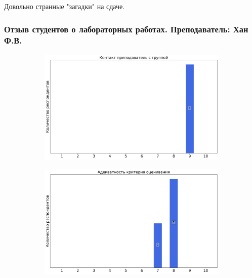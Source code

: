                 \begin{commentbox} 
                    Довольно странные "загадки" на сдаче. 
                \end{commentbox}

                
        \subsubsection{Отзыв студентов о лабораторных работах. Преподаватель: Хан Ф.В.}
            \begin{figure}[H]
                \centering
                \begin{subfigure}[b]{0.45\textwidth}
                    \centering
                    \includegraphics[width=\textwidth]{images/3 course/Общая физика - квантовая физика/labniks-marks-Хан Ф.В.-0.png}
                \end{subfigure}
                \begin{subfigure}[b]{0.45\textwidth}
                    \centering
                    \includegraphics[width=\textwidth]{images/3 course/Общая физика - квантовая физика/labniks-marks-Хан Ф.В.-1.png}

\end{subfigure}
\end{figure}
